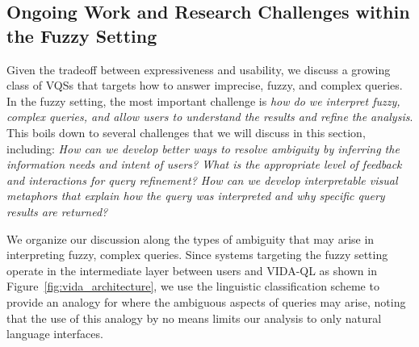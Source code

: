 \documentclass[11pt]{article}
\newcommand{\vidaql}{\textsc{VIDA-QL}\xspace}
\begin{document}

\subsection{Ongoing Work and Research Challenges within the Fuzzy Setting}
\par Given the tradeoff between 
expressiveness and usability, 
we discuss a growing class of VQSs that targets how to answer imprecise, fuzzy, and complex queries. In the fuzzy setting, the most important challenge is {\em how do we interpret fuzzy, complex queries,
and allow users to understand the results and refine
the analysis}. This boils down to several challenges 
that we will discuss in this section,
including:
{\em How can we develop better ways to
 resolve ambiguity by inferring 
 the information needs and 
 intent of users? 
 What is the appropriate level 
 of feedback and interactions for query refinement? 
 How can we develop interpretable 
 visual metaphors that explain how the query 
 was interpreted and why specific query results are returned?} 

We organize our discussion along the 
types of ambiguity that may arise  
in interpreting fuzzy, complex queries. 
Since systems 
targeting the fuzzy setting 
operate in the intermediate layer 
between users and \vidaql 
as shown in Figure~\ref{fig:vida_architecture}, 
we use the linguistic classification scheme 
to provide an analogy for where the ambiguous 
aspects of queries may arise, 
noting that the use of this analogy 
by no means limits our analysis to only natural language interfaces.
\end{document}
